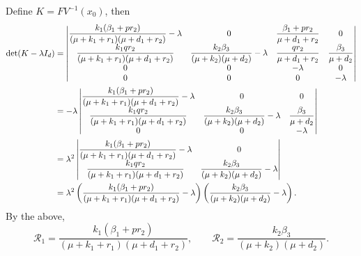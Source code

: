     Define $K = FV^{-1}(x_0)$, then
    \begin{align*}	
    	\det(K-\lambda I_d)
    	&= 
    	\begin{vmatrix}
    		\dfrac{k_1(\beta_1 + pr_2)}{(\mu + k_1 + r_1)(\mu + d_1 +r_2)} 
    	    -\lambda 
    	    & 0 
    	    & \dfrac{\beta_1 + pr_2}{\mu + d_1 +r_2} 
    	    & 0 
    	  \\
    		\dfrac{k_1 qr_2}{(\mu + k_1 + r_1)(\mu + d_1 +r_2)} 
    		& \dfrac{k_2 \beta_3}{(\mu + k_2)(\mu + d_2)} -\lambda 
    		& \dfrac{qr_2}{\mu + d_1 +r_2} 
    		& \dfrac{\beta_3}{\mu + d_2} 
    		\\
    		0 & 0 & -\lambda & 0 
    		\\
    		0 & 0 & 0 & -\lambda 
    		\\
    	\end{vmatrix} \notag \\
    	&= -\lambda
    	\begin{vmatrix}
    		\dfrac{k_1(\beta_1 + pr_2)}{(\mu + k_1 + r_1)(\mu + d_1 +r_2)} 
    			-\lambda & 0 & 0 
    		\\
    		\dfrac{k_1 q r_2}{(\mu + k_1 + r_1)(\mu + d_1 +r_2)} 
    			& \dfrac{k_2 \beta_3}{(\mu + k_2)(\mu + d_2)}
            -\lambda &\dfrac{\beta_3}{\mu + d_2} 
        \\
    		0 & 0 & -\lambda 
    	\end{vmatrix}
    	\\
    	&= \lambda^2
    	\begin{vmatrix}
    		\dfrac{k_1(\beta_1 + pr_2)}{(\mu + k_1 + r_1)(\mu + d_1 +r_2)} -\lambda 
    			& 0 
    		\\
    		\dfrac{k_1 q r_2}{(\mu + k_1 + r_1)(\mu + d_1 +r_2)} 
    			& \dfrac{k_2 \beta_3}{(\mu + k_2)(\mu + d_2)} 
           -\lambda 
        \\
    	\end{vmatrix} 
    	\\
    		&= 
    		\lambda^2 
    	  \left( 
    		  \dfrac{k_1(\beta_1 + pr_2)}{(\mu + k_1 + r_1)(\mu + d_1 +r_2)} 
    		  -\lambda 
    		\right) 
        \left(
    	    \dfrac{k_2 \beta_3}{(\mu + k_2)(\mu + d_2)}-\lambda 
    	  \right).
    \end{align*} 
    By the above,
    $$
    	\mathscr{R}_{1} = 
    		\dfrac{k_1(\beta_{1} + pr_2)}{(\mu + k_1 + r_1)(\mu + d_1 +r_2)} ,
    		\qquad
    	\mathscr{R}_{2} = 
    		\dfrac{k_2 	\beta_{3}}{(\mu + k_2)(\mu + d_2)}.
    $$
